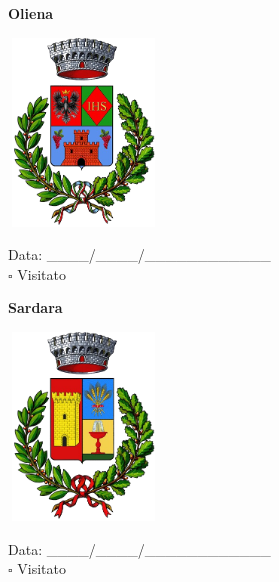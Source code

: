 \documentclass[a5paper,12pt]{article}
\begin{document}
\newpage

\noindent
\begin{minipage}[t]{0.45\textwidth}
    \begin{center}
        \textbf{Oliena}
    \end{center}
    \vspace{-0.4cm} %
    \begin{center}
        \includegraphics[height= 5cm, width=4cm]{Sardegna/Stemma Oliena.png}
    \end{center}
    \vspace{-0.5cm} %
    \begin{flushleft}
        Data: \_\_\_\_/\_\_\_\_/\_\_\_\_\_\_\_\_\_\_\_\_ \\
        $\square$ Visitato
    \end{flushleft}
\end{minipage}
\hfill
\noindent
\begin{minipage}[t]{0.45\textwidth}
    \begin{center}
        \textbf{Sardara}
    \end{center}
    \vspace{-0.4cm} %
    \begin{center}
        \includegraphics[height= 5cm, width=4cm]{Sardegna/Stemma Sardara.png}
    \end{center}
    \vspace{-0.5cm} %
    \begin{flushleft}
        Data: \_\_\_\_/\_\_\_\_/\_\_\_\_\_\_\_\_\_\_\_\_ \\
        $\square$ Visitato
    \end{flushleft}
\end{minipage}
\hfill
\end{document}
